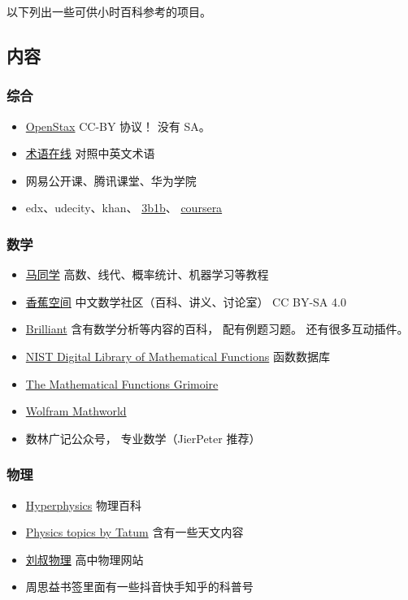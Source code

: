 
以下列出一些可供小时百科参考的项目。

\subsection{内容}
\subsubsection{综合}
\begin{itemize}
\item \href{https://openstax.org/}{OpenStax} CC-BY 协议！ 没有 SA。
\item \href{https://www.termonline.cn/index}{术语在线} 对照中英文术语
\item 网易公开课、腾讯课堂、华为学院
\item edx、udecity、khan、 \href{https://www.youtube.com/@3blue1brown}{3b1b}、 \href{https://www.coursera.org/}{coursera}
\end{itemize}

\subsubsection{数学}
\begin{itemize}
\item \href{https://www.matongxue.com/}{马同学} 高数、线代、概率统计、机器学习等教程
\item \href{https://www.bananaspace.org/wiki/}{香蕉空间} 中文数学社区（百科、讲义、讨论室） CC BY-SA 4.0
\item \href{https://brilliant.org/}{Brilliant} 含有数学分析等内容的百科， 配有例题习题。 还有很多互动插件。
\item \href{https://dlmf.nist.gov/}{NIST Digital Library of Mathematical Functions} 函数数据库
\item \href{https://fungrim.org/}{The Mathematical Functions Grimoire}
\item \href{https://mathworld.wolfram.com/}{Wolfram Mathworld}
\item 数林广记公众号， 专业数学（JierPeter 推荐）
\end{itemize}

\subsubsection{物理}
\begin{itemize}
\item \href{http://hyperphysics.phy-astr.gsu.edu/}{Hyperphysics} 物理百科
\item \href{http://www.astro.uvic.ca/~tatum/index.php}{Physics topics by Tatum} 含有一些天文内容
\item \href{http://www.myliushu.com/}{刘叔物理} 高中物理网站
\item 周思益书签里面有一些抖音快手知乎的科普号
\end{itemize}

